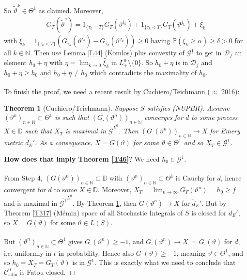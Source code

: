 \documentclass[12pt,a4paper, twoside]{article}
\newtheorem{thm}{Theorem}[section]
\theoremstyle{definition}
\newcommand{\PP}{\mathbb{P}} %
\begin{document}
So $\widetilde{\vartheta}^k \in \Theta^1$ as claimed.
\newpage Moreover, 
\begin{align*}
G_T( \widetilde{\vartheta}^*) = 1_{\{ \tau_k = T\}} G_T( \vartheta^{i_k}) + 1_{\{ \tau_k < T\}} G_T( \vartheta^{j_k}) + \xi_k
\end{align*}
 with $\xi_k = 1_{\{ \tau_k < T\}} ( G_{\tau_k} ( \vartheta^{i_k}) - G_{\tau_k} ( \vartheta^{j_k})) \geq 0$ having $\PP( \xi_k \geq \alpha) \geq \delta > 0$ for all $k \in \mathbb{N}$. Then use Lemma \ref{L44} (Komlos) plus convexity of $\mathcal{G}^1$ to get in $\mathcal{D}_f$ an element $h_0 + \eta$ with $\eta = \lim_{k \to 0} \widetilde{ \xi_k}$ in $L_+^0 \setminus \{0\}$. So $h_0 + \eta$ is in $\mathcal{D}_f$ and $h_0 + \eta \geq h_0$ and $h_0 + \eta \neq h_0$ which contradicts the maximality of $h_0$. 
 \\\\
 To finish the proof, we need a recent result by Cuchiero/Teichmann ($\approx$ 2016):
\begin{thm}[Cuchiero/Teichmann] \label{T47} Suppose $S$ satisfies (NUPBR). Assume $( \vartheta^n)_{n \in \mathbb{N}} \subset \Theta^1$ is such that $(G_\cdot ( \vartheta^n))_{n \in \mathbb{N}}$ converges for $d$ to some process $X \in \mathbb{D}$ such that $X_T$ is maximal in $\overline{\mathcal{G}}^{L^0}$. Then $(G_\cdot ( \vartheta^n))_{n \in \mathbb{N}} \to X$ for Emery metric $\widetilde{d}_E'$. As a consequence, $X= G( \vartheta)$ for some $\vartheta \in \Theta^1$ and so $X_T \in \mathcal{G}^1$. 
\end{thm}
\noindent \textbf{How does that imply Theorem \ref{T46}}? We need $h_0 \in \mathcal{G}^1$.\\
\\
From Step 4, $(G( \vartheta^n))_{n \in \mathbb{N}} \subset \mathbb{D}$ with $( \vartheta^n)_{n \in \mathbb{N}} \subset \Theta^1$ is Cauchy for $d$, hence convergent for $d$ to some $X \in \mathbb{D}$. Moreover,  $ X_T= \lim_{n \to \infty} G_T( \vartheta^n)=h_0 \geq f$ and is maximal in $\overline{\mathcal{G}^1}^{L^0}$. By Theorem \ref{T47}, then $G( \vartheta^n) \to X$ for $\widetilde{d}_E'$. But by Theorem \ref{T317} (Mémin) space of all Stochastic Integrals of $S$ is closed for $\widetilde{d}_E'$, so $X=G ( \vartheta)$ for some $\vartheta \in L(S)$. 
\\\\
But $( \vartheta^n)_{n \in \mathbb{N}} \subset \Theta^1$ gives $G_\cdot ( \vartheta^n) \geq -1$, and $G_\cdot ( \vartheta^n) \to X_\cdot = G_\cdot ( \vartheta)$ for $d$, i.e. uniformly in $t$ in probability. Hence also $G_\cdot ( \vartheta) \geq -1$, meaning $\vartheta \in \Theta^1$, and so $h_0 = X_T = G_T( \vartheta)$ is in $\mathcal{G}^1$. This is exactly what we need to conclude that $\mathcal{C}_\text{adm}^0$ is Fatou-closed. \hfill $\Box$
\end{document}
